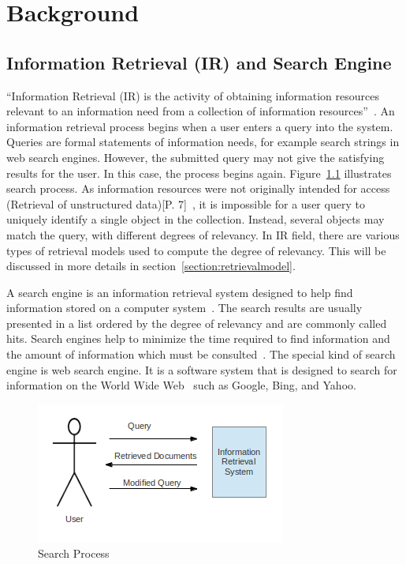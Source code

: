 
\chapter{Background}\label{section:background}

\section{Information Retrieval (IR) and Search Engine}\label{section:IR}
``Information Retrieval (IR) is the activity of obtaining information resources relevant to an information need from a collection of information resources''~\cite{IR}. 
An information retrieval process begins when a user 
enters a query into the system. Queries are formal statements of information needs, for example search strings in web search engines. However, the 
submitted query may not give the satisfying results for the user. In this case, the process begins again. Figure~\ref{fig:retrieval_process} illustrates
search process. As information resources were not originally intended for access (Retrieval of unstructured data)[P. 7]~\cite{IRlecture}, 
it is impossible for a user query to uniquely identify a single object in the collection. Instead, several objects may match the query, 
with different degrees of relevancy. In IR field, there are various types of retrieval models used to compute the degree of relevancy. This will
be discussed in more details in section~\ref{section:retrievalmodel}.

A search engine is an information retrieval system designed to help find information stored on a computer system~\cite{searchengine}. The search results are usually 
presented in a list ordered by the degree of relevancy and are commonly called hits. 
Search engines help to minimize the time required to find information and the amount of 
information which must be consulted~\cite{searchengine}. The special kind of search engine is 
web search engine. It is a software system that is designed to search for information on the World Wide Web~\cite{websearchengine} such as Google, 
Bing, and Yahoo.

\begin{figure}
\centering
\includegraphics[scale=1]{./figures/retrieval_process.png}
\caption{Search Process} \label{fig:retrieval_process}
\end{figure}

